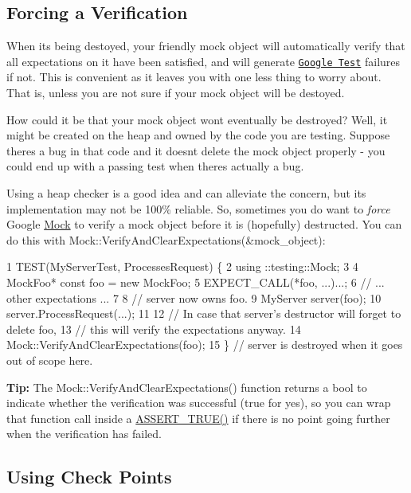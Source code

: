 \subsection*{Forcing a Verification}

When it\textquotesingle{}s being destoyed, your friendly mock object will automatically verify that all expectations on it have been satisfied, and will generate \href{../../googletest/}{\tt Google Test} failures if not. This is convenient as it leaves you with one less thing to worry about. That is, unless you are not sure if your mock object will be destoyed.

How could it be that your mock object won\textquotesingle{}t eventually be destroyed? Well, it might be created on the heap and owned by the code you are testing. Suppose there\textquotesingle{}s a bug in that code and it doesn\textquotesingle{}t delete the mock object properly -\/ you could end up with a passing test when there\textquotesingle{}s actually a bug.

Using a heap checker is a good idea and can alleviate the concern, but its implementation may not be 100\% reliable. So, sometimes you do want to {\itshape force} Google \hyperlink{class_mock}{Mock} to verify a mock object before it is (hopefully) destructed. You can do this with {\ttfamily Mock\+::\+Verify\+And\+Clear\+Expectations(\&mock\+\_\+object)}\+:


\begin{DoxyCode}
1 TEST(MyServerTest, ProcessesRequest) \{
2   using ::testing::Mock;
3 
4   MockFoo* const foo = new MockFoo;
5   EXPECT\_CALL(*foo, ...)...;
6   // ... other expectations ...
7 
8   // server now owns foo.
9   MyServer server(foo);
10   server.ProcessRequest(...);
11 
12   // In case that server's destructor will forget to delete foo,
13   // this will verify the expectations anyway.
14   Mock::VerifyAndClearExpectations(foo);
15 \}  // server is destroyed when it goes out of scope here.
\end{DoxyCode}


{\bfseries Tip\+:} The {\ttfamily Mock\+::\+Verify\+And\+Clear\+Expectations()} function returns a {\ttfamily bool} to indicate whether the verification was successful ({\ttfamily true} for yes), so you can wrap that function call inside a {\ttfamily \hyperlink{gtest_8h_ae9244bfbda562e8b798789b001993fa5}{A\+S\+S\+E\+R\+T\+\_\+\+T\+R\+U\+E()}} if there is no point going further when the verification has failed.

\subsection*{Using Check Points}

